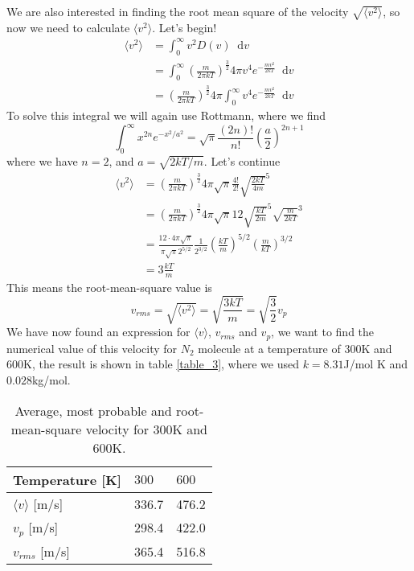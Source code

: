 \documentclass[a4paper,10pt, english]{article}
\newcommand*\diff{\mathop{}\!\mathrm{d}}
\begin{document}
We are also interested in finding the root mean square of the velocity $\sqrt{\langle v^2\rangle }$, so now we need to calculate $\langle v^2\rangle$. Let's begin!
\begin{align*}
    \langle v^2\rangle &= \int_0^\infty v^2D(v)\diff v \\
    &= \int_0^\infty \left(\frac{m}{2\pi kT}\right)^{\frac{3}{2}}4\pi v^4e^{-\frac{mv^2}{2kT}} \diff v \\
    &= \left(\frac{m}{2\pi kT}\right)^{\frac{3}{2}}4\pi \int_0^\infty v^4e^{-\frac{mv^2}{2kT}} \diff v
\end{align*}
To solve this integral we will again use Rottmann, where we find
\begin{equation}
    \int_0^\infty x^{2n} e^{-x^2/a^2} = \sqrt{\pi}\frac{\left(2n\right)!}{n!}\left(\frac{a}{2}\right)^{2n+1}
\end{equation}
where we have $n=2$, and $a=\sqrt{2kT/m}$. Let's continue
\begin{align*}
    \langle v^2\rangle &= \left(\frac{m}{2\pi kT}\right)^{\frac{3}{2}}4\pi \sqrt{\pi}\frac{4!}{2!} \sqrt{\frac{2kT}{4m}}^5 \\
    &= \left(\frac{m}{2\pi kT}\right)^{\frac{3}{2}}4\pi\sqrt{\pi}12 \sqrt{\frac{kT}{2m}}^5\sqrt{\frac{m}{2kT}}^3 \\
    &= \frac{12\cdot 4 \pi\sqrt{\pi}}{\pi\sqrt{\pi}2^{5/2}}\frac{1}{2^{3/2}}\left(\frac{kT}{m}\right)^{5/2}\left(\frac{m}{kT}\right)^{3/2} \\
    &= 3\frac{kT}{m}
\end{align*}
This means the root-mean-square value is
\begin{equation}
    v_{rms} = \sqrt{\langle v^2\rangle} = \sqrt{\frac{3kT}{m}} = \sqrt{\frac{3}{2}}v_p
\end{equation}
We have now found an expression for $\langle v \rangle$, $v_{rms}$ and $v_p$, we want to find the numerical value of this velocity for $N_2$ molecule at a temperature of $300$K and $600$K, the result is shown in table \vref{table_3}, where we used $k=8.31$J/mol K and $0.028$kg/mol.
\begin{table}[]
    \begin{center}
    \caption{Average, most probable and root-mean-square velocity for $300$K and $600$K.}
    \begin{tabular}{@{}lll@{}}
    \toprule
    Temperature {[}K{]}                               & $300$ & $600$ \\ \midrule
    $\langle v \rangle$ [m/s] & 336.7 & 476.2 \\
    $v_p$ [m/s]                                            & 298.4 & 422.0 \\
    $v_{rms}$ [m/s]                                         & 365.4 & 516.8 \\ \bottomrule
    \end{tabular}
    \label{table_3}
    \end{center}
\end{table}
\end{document}
